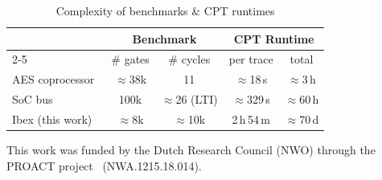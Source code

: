 \documentclass[sigconf]{acmart}
\begin{document}
{

\begin{table}[h]
\centering
\caption{Complexity of benchmarks \& CPT runtimes}
\label{tab:runtime_context}

\begin{tabular}{lcccc}
\hline
 & \multicolumn{2}{c}{Benchmark} & \multicolumn{2}{c}{CPT Runtime} \\
\cline{2-5}
 & \# gates & \# cycles & per trace & total \\
\hline
AES coprocessor~\cite{projectvault_aes_verilog}
 & $\approx$38k & 11 & $\approx$18\,s & $\approx$3\,h \\

SoC bus~\cite{ACA}
 & 100k & $\approx$26 (LTI) & $\approx$329\,s & $\approx$60\,h \\

Ibex (this work)
 & $\approx$8k & $\approx$10k & 2\,h\,54\,m & $\approx$70\,d \\
\hline
\end{tabular}
\vspace{-3mm}
\end{table}
}

\begin{acks}
This work was funded by the Dutch Research Council (NWO) through the PROACT project~\cite{PROACT} (NWA.1215.18.014).
\end{acks}








\end{document}
